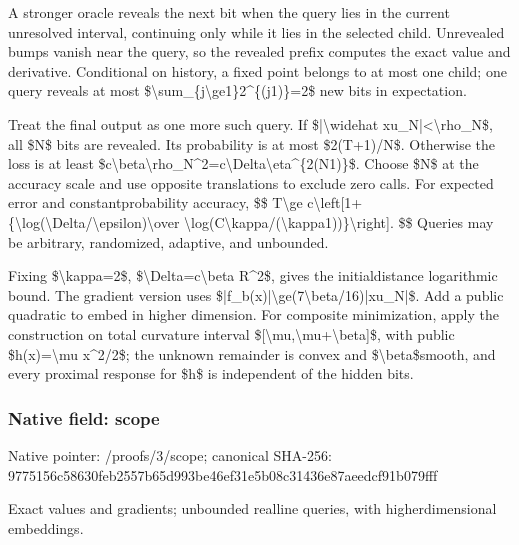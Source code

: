\documentclass[10pt,a4paper]{article}
\begin{document}
A stronger oracle reveals the next bit when the query lies in the current unresolved interval, continuing only while it lies in the selected child. Unrevealed bumps vanish near the query, so the revealed prefix computes the exact value and derivative. Conditional on history, a fixed point belongs to at most one child; one query reveals at most \$\textbackslash{}sum\_\{j\textbackslash{}ge1\}2\textasciicircum{}\{(j1)\}=2\$ new bits in expectation.

Treat the final output as one more such query. If \$|\textbackslash{}widehat xu\_N|<\textbackslash{}rho\_N\$, all \$N\$ bits are revealed. Its probability is at most \$2(T+1)/N\$. Otherwise the loss is at least
\$c\textbackslash{}beta\textbackslash{}rho\_N\textasciicircum{}2=c\textbackslash{}Delta\textbackslash{}eta\textasciicircum{}\{2(N1)\}\$.
Choose \$N\$ at the accuracy scale and use opposite translations to exclude zero calls. For expected error and constantprobability accuracy,
\$\$
T\textbackslash{}ge c\textbackslash{}left[1+\{\textbackslash{}log(\textbackslash{}Delta/\textbackslash{}epsilon)\textbackslash{}over
\textbackslash{}log(C\textbackslash{}kappa/(\textbackslash{}kappa1))\}\textbackslash{}right].
\$\$
Queries may be arbitrary, randomized, adaptive, and unbounded.

Fixing \$\textbackslash{}kappa=2\$, \$\textbackslash{}Delta=c\textbackslash{}beta R\textasciicircum{}2\$, gives the initialdistance logarithmic bound. The gradient version uses
\$|f\_b(x)|\textbackslash{}ge(7\textbackslash{}beta/16)|xu\_N|\$.
Add a public quadratic to embed in higher dimension. For composite minimization, apply the construction on total curvature interval \$[\textbackslash{}mu,\textbackslash{}mu+\textbackslash{}beta]\$, with public \$h(x)=\textbackslash{}mu x\textasciicircum{}2/2\$; the unknown remainder is convex and \$\textbackslash{}beta\$smooth, and every proximal response for \$h\$ is independent of the hidden bits.


\subsubsection{Native field: scope}


Native pointer: /proofs/3/scope; canonical SHA-256: 9775156c58630feb2557b65d\allowbreak{}993be46ef31e5b08c31436e8\allowbreak{}7aeedcf91b079fff


Exact values and gradients; unbounded realline queries, with higherdimensional embeddings.
\end{document}
